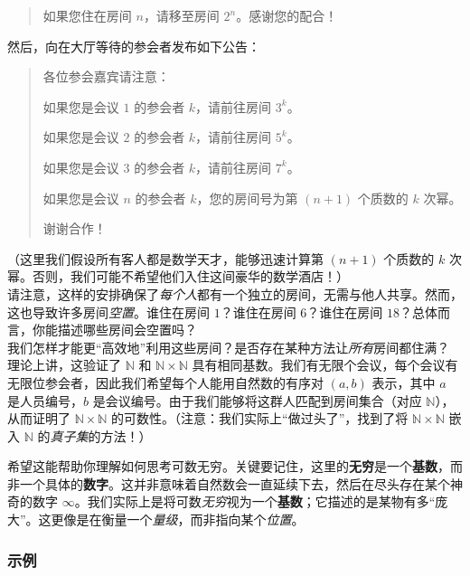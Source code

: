 \begin{itemize}
\begin{quotation}
              如果您住在房间 $n$，请移至房间 $2^n$。感谢您的配合！
          \end{quotation}
          然后，向在大厅等待的参会者发布如下公告：
          \begin{quotation}
              各位参会嘉宾请注意：

              如果您是会议 $1$ 的参会者 $k$，请前往房间 $3^k$。

              如果您是会议 $2$ 的参会者 $k$，请前往房间 $5^k$。

              如果您是会议 $3$ 的参会者 $k$，请前往房间 $7^k$。

              如果您是会议 $n$ 的参会者 $k$，您的房间号为第 $(n+1)$ 个质数的 $k$ 次幂。

              谢谢合作！
          \end{quotation}
          （这里我们假设所有客人都是数学天才，能够迅速计算第 $(n + 1)$ 个质数的 $k$ 次幂。否则，我们可能不希望他们入住这间豪华的数学酒店！）\\

           请注意，这样的安排确保了\emph{每个人}都有一个独立的房间，无需与他人共享。然而，这也导致许多房间\emph{空置}。谁住在房间 $1$？谁住在房间 $6$？谁住在房间 $18$？总体而言，你能描述哪些房间会空置吗？\\

           我们怎样才能更``高效地''利用这些房间？是否存在某种方法让\emph{所有}房间都住满？\\

           理论上讲，这验证了 $\mathbb{N}$ 和 $\mathbb{N} \times \mathbb{N}$ 具有相同基数。我们有无限个会议，每个会议有无限位参会者，因此我们希望每个人能用自然数的有序对 $(a,b)$ 表示，其中 $a$ 是人员编号，$b$ 是会议编号。由于我们能够将这群人匹配到房间集合（对应 $\mathbb{N}$），从而证明了 $\mathbb{N} \times \mathbb{N}$ 的可数性。（注意：我们实际上``做过头了''，找到了将 $\mathbb{N} \times \mathbb{N}$ 嵌入 $\mathbb{N}$ 的\emph{真子集}的方法！）\\
\end{itemize}

希望这能帮助你理解如何思考可数无穷。关键要记住，这里的\textbf{无穷}是一个\textbf{基数}，而非一个具体的\textbf{数字}。这并非意味着自然数会一直延续下去，然后在尽头存在某个神奇的数字 $\infty$。我们实际上是将可数\emph{无穷}视为一个\textbf{基数}；它描述的是某物有多``庞大''。这更像是在衡量一个\emph{量级}，而非指向某个\emph{位置}。

\subsubsection*{示例}

